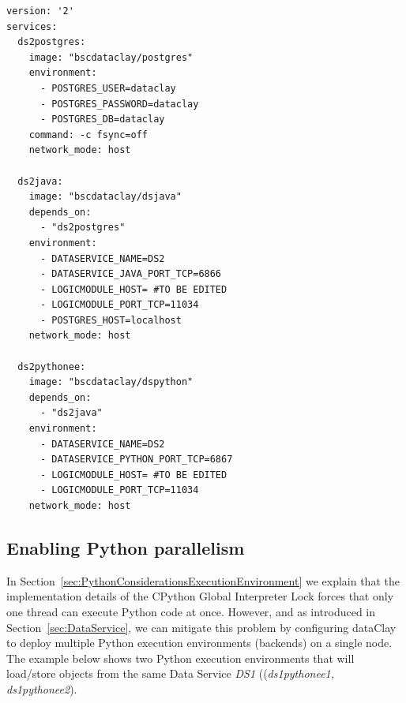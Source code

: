 \begin{tBox}
 \begin{lstlisting}[language=docker-compose-2, frame=none]
version: '2'
services:
  ds2postgres:
    image: "bscdataclay/postgres"
    environment:
      - POSTGRES_USER=dataclay
      - POSTGRES_PASSWORD=dataclay
      - POSTGRES_DB=dataclay
    command: -c fsync=off
    network_mode: host

  ds2java:
    image: "bscdataclay/dsjava"
    depends_on:
      - "ds2postgres"
    environment:
      - DATASERVICE_NAME=DS2
      - DATASERVICE_JAVA_PORT_TCP=6866
      - LOGICMODULE_HOST= #TO BE EDITED
      - LOGICMODULE_PORT_TCP=11034
      - POSTGRES_HOST=localhost
    network_mode: host

  ds2pythonee:
    image: "bscdataclay/dspython"
    depends_on:
      - "ds2java"
    environment:
      - DATASERVICE_NAME=DS2
      - DATASERVICE_PYTHON_PORT_TCP=6867
      - LOGICMODULE_HOST= #TO BE EDITED
      - LOGICMODULE_PORT_TCP=11034
    network_mode: host
 \end{lstlisting}
\end{tBox}



\subsection{Enabling Python parallelism}
\label{sec:PythonParallelism}

In Section~\ref{sec:PythonConsiderationsExecutionEnvironment} we explain that the implementation details of the CPython Global Interpreter Lock forces that only one thread can execute Python code at once. However, and as introduced in Section~\ref{sec:DataService}, we can mitigate this problem by configuring dataClay to deploy multiple Python execution environments (backends) on a single node. The example below shows two Python execution environments that will load/store objects from the same Data Service \textit{DS1} ((\textit{ds1pythonee1, ds1pythonee2}).


